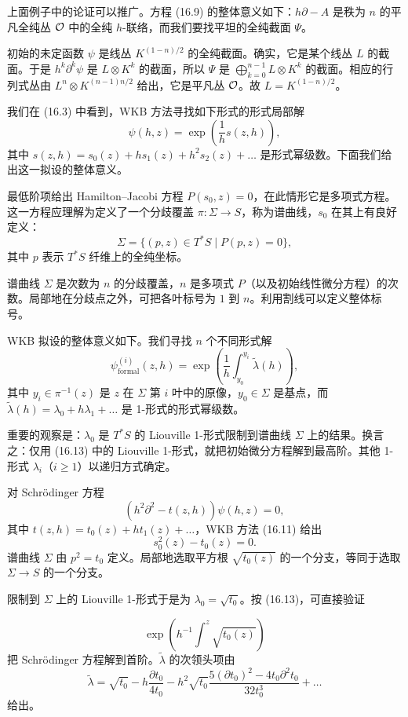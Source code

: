 上面例子中的论证可以推广。方程 (16.9) 的整体意义如下：$h\partial-A$ 是秩为 $n$ 的平凡全纯丛 $\mathcal{O}$ 中的全纯 $h$-联络，而我们要找平坦的全纯截面 $\Psi$。

初始的未定函数 $\psi$ 是线丛 $K^{(1-n)/2}$ 的全纯截面。确实，它是某个线丛 $L$ 的截面。于是 $h^k\partial^k\psi$ 是 $L\otimes K^k$ 的截面，所以 $\Psi$ 是 $\bigoplus_{k=0}^{n-1}L\otimes K^k$ 的截面。相应的行列式丛由 $L^n\otimes K^{(n-1)n/2}$ 给出，它是平凡丛 $\mathcal{O}$。故 $L=K^{(1-n)/2}$。

我们在 (16.3) 中看到，WKB 方法寻找如下形式的形式局部解
\begin{equation}
\psi(h,z)=\exp\left(\frac1h s(z,h)\right),
\tag{16.11}
\end{equation}
其中 $s(z,h)=s_0(z)+hs_1(z)+h^2s_2(z)+\dots$ 是形式幂级数。下面我们给出这一拟设的整体意义。

最低阶项给出 Hamilton–Jacobi 方程 $P(s_0,z)=0$，在此情形它是多项式方程。这一方程应理解为定义了一个分歧覆盖 $\pi:\Sigma\to S$，称为谱曲线，$s_0$ 在其上有良好定义：
\begin{equation}
\Sigma=\{(p,z)\in T^*S\mid P(p,z)=0\},
\tag{16.12}
\end{equation}
其中 $p$ 表示 $T^*S$ 纤维上的全纯坐标。

谱曲线 $\Sigma$ 是次数为 $n$ 的分歧覆盖，$n$ 是多项式 $P$（以及初始线性微分方程）的次数。局部地在分歧点之外，可把各叶标号为 $1$ 到 $n$。利用割线可以定义整体标号。

WKB 拟设的整体意义如下。我们寻找 $n$ 个不同形式解
\begin{equation}
\psi^{(i)}_{\mathrm{formal}}(z,h)=\exp\left(\frac1h\int_{y_0}^{y_i}\tilde\lambda(h)\right),
\tag{16.13}
\end{equation}
其中 $y_i\in\pi^{-1}(z)$ 是 $z$ 在 $\Sigma$ 第 $i$ 叶中的原像，$y_0\in\Sigma$ 是基点，而 $\tilde\lambda(h)=\lambda_0+h\lambda_1+\dots$ 是 1-形式的形式幂级数。

重要的观察是：$\lambda_0$ 是 $T^*S$ 的 Liouville 1-形式限制到谱曲线 $\Sigma$ 上的结果。换言之：仅用 (16.13) 中的 Liouville 1-形式，就把初始微分方程解到最高阶。其他 1-形式 $\lambda_i$（$i\ge1$）以递归方式确定。

\begin{example}[16.4] 对 Schrödinger 方程
\[
(h^2\partial^2-t(z,h))\psi(h,z)=0,
\]
其中 $t(z,h)=t_0(z)+ht_1(z)+\dots$，WKB 方法 (16.11) 给出
\[
s_0^2(z)-t_0(z)=0.
\]
谱曲线 $\Sigma$ 由 $p^2=t_0$ 定义。局部地选取平方根 $\sqrt{t_0(z)}$ 的一个分支，等同于选取 $\Sigma\to S$ 的一个分支。

限制到 $\Sigma$ 上的 Liouville 1-形式于是为 $\lambda_0=\sqrt{t_0}$。按 (16.13)，可直接验证

\[
\exp\left(h^{-1}\int^z\sqrt{t_0(z)}\right)
\]
把 Schrödinger 方程解到首阶。$\tilde\lambda$ 的次领头项由
\[
\tilde\lambda=\sqrt{t_0}-h\frac{\partial t_0}{4t_0}-h^2\sqrt{t_0}\frac{5(\partial t_0)^2-4t_0\partial^2t_0}{32t_0^3}+\dots
\]
给出。\end{example}

